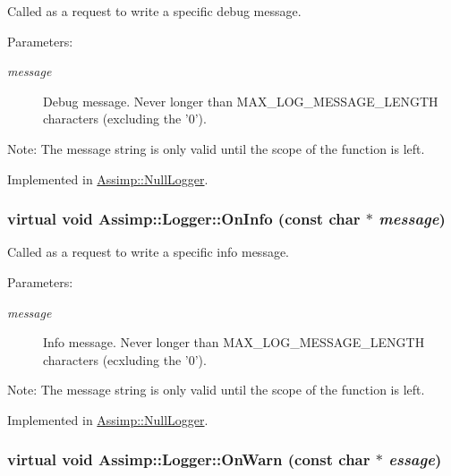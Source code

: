 Called as a request to write a specific debug message. 

\begin{Desc}
\item[Parameters:]
\begin{description}
\item[{\em message}]Debug message. Never longer than MAX\_\-LOG\_\-MESSAGE\_\-LENGTH characters (excluding the '0'). \end{description}
\end{Desc}
\begin{Desc}
\item[Note:]The message string is only valid until the scope of the function is left. \end{Desc}


Implemented in \hyperlink{class_assimp_1_1_null_logger_f354ebbd382b7097a55d364794a45631}{Assimp::NullLogger}.\hypertarget{class_assimp_1_1_logger_ba81c4562ff8db83f06c6b62f2eb7983}{
\subsubsection[OnInfo]{\setlength{\rightskip}{0pt plus 5cm}virtual void Assimp::Logger::OnInfo (const char $\ast$ {\em message})}}
\label{class_assimp_1_1_logger_ba81c4562ff8db83f06c6b62f2eb7983}


Called as a request to write a specific info message. 

\begin{Desc}
\item[Parameters:]
\begin{description}
\item[{\em message}]Info message. Never longer than MAX\_\-LOG\_\-MESSAGE\_\-LENGTH characters (ecxluding the '0'). \end{description}
\end{Desc}
\begin{Desc}
\item[Note:]The message string is only valid until the scope of the function is left. \end{Desc}


Implemented in \hyperlink{class_assimp_1_1_null_logger_12d2b0048d17a819c8c00277ad1394c5}{Assimp::NullLogger}.\hypertarget{class_assimp_1_1_logger_b8066978dd37992f711d75d49cf4607b}{
\subsubsection[OnWarn]{\setlength{\rightskip}{0pt plus 5cm}virtual void Assimp::Logger::OnWarn (const char $\ast$ {\em essage})}}
\label{class_assimp_1_1_logger_b8066978dd37992f711d75d49cf4607b}


